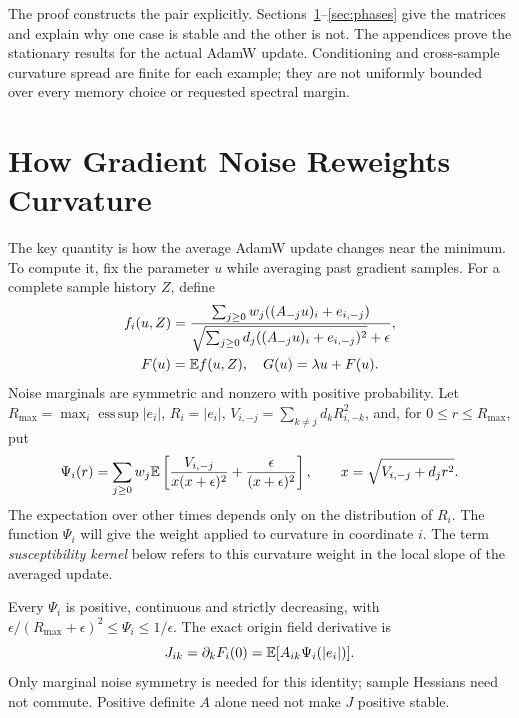The proof constructs the pair explicitly. Sections~\ref{sec:field}--\ref{sec:phases}
give the matrices and explain why one case is stable and the other is not.
The appendices prove the stationary results for the actual AdamW update.
Conditioning and
cross-sample curvature spread are finite for each example; they are not
uniformly bounded over every memory choice or requested spectral margin.

\section{How Gradient Noise Reweights Curvature}\label{sec:field}
The key quantity is how the average AdamW update changes near the minimum.
To compute it, fix the parameter $u$ while averaging past gradient samples.
For a complete sample history $Z$, define
\[
\begin{gathered}
 f_i(u,Z)=\frac{\sum_{j\geq0}w_j((A_{-j}u)_i+e_{i,-j})}
 {\sqrt{\sum_{j\geq0}d_j((A_{-j}u)_i+e_{i,-j})^2}+\epsilon},
 \\ F(u)=\mathbb E f(u,Z),\quad G(u)=\lambda u+F(u).
\end{gathered}
\]
Noise marginals are symmetric and nonzero with positive probability.
Let $R_{\max}=\max_i\operatorname{ess\,sup}|e_i|$,
$R_i=|e_i|$, $V_{i,-j}=\sum_{k\ne j}d_kR_{i,-k}^2$, and, for
$0\leq r\leq R_{\max}$, put
\begin{equation}\label{eq:psi}
 \Psi_i(r)=\sum_{j\geq0}w_j\mathbb E\left[
 \frac{V_{i,-j}}{x(x+\epsilon)^2}
       +\frac{\epsilon}{(x+\epsilon)^2}\right],
 \qquad x=\sqrt{V_{i,-j}+d_jr^2}.
\end{equation}
The expectation over other times depends only on the distribution of $R_i$.
The function $\Psi_i$ will give the weight applied to curvature in coordinate
$i$. The term \emph{susceptibility kernel} below refers to this curvature
weight in the local slope of the averaged update.

\begin{proposition}\label{prop:rowkernel}
Every $\Psi_i$ is positive, continuous and strictly decreasing, with
$\epsilon/(R_{\max}+\epsilon)^2\leq\Psi_i\leq1/\epsilon$.
The exact origin field derivative is
\begin{equation}\label{eq:rowkernel}
 J_{ik}=\partial_kF_i(0)=\mathbb E[A_{ik}\Psi_i(|e_i|)].
\end{equation}
Only marginal noise symmetry is needed for this identity; sample Hessians
need not commute. Positive definite $A$ alone need not make $J$ positive stable.
\end{proposition}

